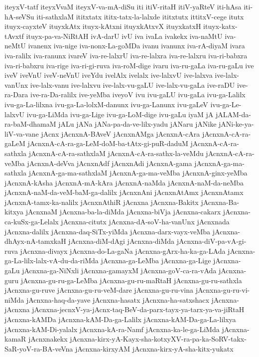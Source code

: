 {iteyxV-tatf
iteyxVvaM
iteyxV-va-mA-diSu
iti
itiV-ritaH
itiV-yaRteV
iti-hAsa
iti-hA-seVSu
iti-sathxlaM
ititxtatx
ititx-tatx-la-lalxde
ititxtutx
ittitxV-cege
itutx
ituyx-cayxteV
ituyxkAtx
ituyx-kAtxni
ituyxkAtxvX
ituyxkatxH
ituyx-katx-tAvxtf
ituyx-pa-va-NiRtAH
ivA-darU
ivU
iva
ivaLa
ivakekx
iva-naMtU
iva-neMtU
ivanenx
iva-nige
iva-nonx-La-goMDa
ivanu
ivanunx
iva-rA-diyaM
ivara
iva-ralilx
iva-ranunx
ivareV
iva-re-lalxrU
iva-re-lalxra
iva-re-lalxru
iva-ri-babxra
iva-ri-babxru
iva-rige
iva-ri-gi-ruva
iva-roM-dige
ivaru
iva-ru-gaLa
iva-ru-gaLu
ive
iveV
iveVnU
iveV-neVnU
iveYdu
ivelAlx
ivelalx
ive-lalxvU
ive-lalxva
ive-lalx-vanUnx
ive-lalx-vanu
ive-lalxvu
ive-lalx-vu-gaLU
ive-lalx-vu-gaLa
ive-raDU
ive-ra-Dara
ive-ra-Da-ralilx
ive-yeMba
iveyoV
ivu
ivu-gaLU
ivu-gaLa
ivu-ga-Lalilx
ivu-ga-La-lilxna
ivu-ga-La-lolxM-danunx
ivu-ga-Lanunx
ivu-gaLeV
ivu-ga-Le-lalxvU
ivu-ga-LiMda
ivu-ga-Lige
ivu-ga-LoM-dige
ivu-gaLu
iyaM
jA
jALAM-da-ra-baM-dhamaM
jALu
jANa
jANa-pa-da-ve-lilx-yadu
jANaru
jANike
jANi-ke-ya-liV-va-vane
jAcnx
jAcnxnA-BAveV
jAcnxnAMga
jAcnxnA-cAra
jAcnxnA-cA-ra-gaLeM
jAcnxnA-cA-ra-ga-LeM-doM-ba-tAtx-gi-puR-daduM
jAcnxnA-cA-ra-sathxla
jAcnxnA-cA-ra-sathxlaM
jAcnxnA-cA-ra-sathx-la-veMdu
jAcnxnA-cA-ra-veMba
jAcnxnA-deVva
jAcnxnAdf
jAcnxnAdi
jAcnxnA-gama
jAcnxnA-ga-ma-sathxla
jAcnxnA-ga-ma-sathxlaM
jAcnxnA-ga-ma-veMba
jAcnxnA-ginx-yeMba
jAcnxnA-kAsha
jAcnxnA-mA-kAra
jAcnxnA-naMda
jAcnxnA-naM-da-neMba
jAcnxnA-naM-da-veM-baM-ga-dalilx
jAcnxnAni
jAcnxnAtAmx
jAcnxnAtamx
jAcnxnA-tamx-ka-nalilx
jAcnxnAthiR
jAcnxna
jAcnxna-Bakitx
jAcnxna-Ba-kitxya
jAcnxnaM
jAcnxna-ba-la-diMda
jAcnxna-biVja
jAcnxna-cakarx
jAcnxna-ca-kuSx-ga-Lelalx
jAcnxna-citutx
jAcnxna-dA-soV-ha-vanUnx
jAcnxnada
jAcnxna-dalilx
jAcnxna-daq-SiTx-yiMda
jAcnxna-darx-vayx-veMba
jAcnxna-dhAyx-nA-tamxkaH
jAcnxna-diM-dAgi
jAcnxna-diMda
jAcnxna-diV-pa-vA-gi-ruva
jAcnxna-divayx
jAcnxna-do-La-gaNa
jAcnxna-gArx-ha-ka-ga-LAda
jAcnxna-ga-La-lilx-lalx-vA-du-da-riMda
jAcnxna-ga-LeMba
jAcnxna-ga-Lige
jAcnxna-gaLu
jAcnxna-ga-NiNxli
jAcnxna-gamayxM
jAcnxna-goV-ca-ra-vAda
jAcnxna-guru
jAcnxna-gu-ru-ga-LeMba
jAcnxna-gu-ru-maRtaH
jAcnxna-gu-ru-sathxla
jAcnxna-gu-ruve
jAcnxna-gu-ru-veM-dare
jAcnxna-gu-ru-vina
jAcnxna-gu-ru-vi-niMda
jAcnxna-haq-da-yave
jAcnxna-hasatx
jAcnxna-ha-satxshacx
jAcnxna-jAcnxna
jAcnxna-jecnxV-ya-jAcnx-taq-BeV-da-parx-tayx-ya-tarx-ya-va-jiRtaH
jAcnxna-kAMDa
jAcnxna-kAM-Da-ga-Lalilx
jAcnxna-kAM-Da-ga-La-lilxya
jAcnxna-kAM-Di-yalalx
jAcnxna-kA-ra-Namf
jAcnxna-ka-le-ga-LiMda
jAcnxna-kamaR
jAcnxnakekx
jAcnxna-kirx-yA-Kayx-sha-kotxyXV-ra-pa-ka-SoRV-takx-SaR-yoV-ra-BA-veVna
jAcnxna-kirxyAM
jAcnxna-kirx-yA-sha-kitx-yukatx
}
